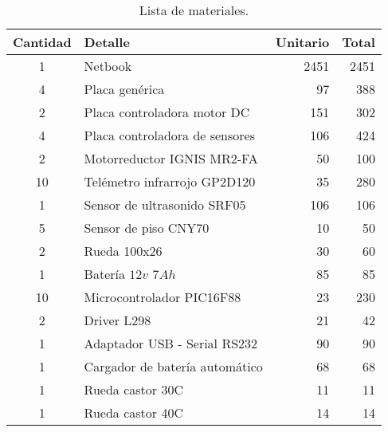\begin{table}[h]
	\begin{center}
		\begin{tabular}{|c|l|r|r|}
			\hline
			Cantidad & Detalle & Unitario  & Total \\
			\hline
			1 & Netbook & 2451 & 2451 \\
			\hline
			4 & Placa gen\'erica & 97 & 388 \\
			\hline
			2 & Placa controladora motor DC & 151 & 302 \\
			\hline
			4 & Placa controladora de sensores & 106 & 424 \\
			\hline
			2 & Motorreductor IGNIS MR2-FA & 50 & 100 \\
			\hline
			10 & Tel\'emetro infrarrojo GP2D120 & 35 & 280 \\
			\hline
			1 & Sensor de ultrasonido SRF05 & 106 & 106 \\
			\hline
			5 & Sensor de piso CNY70 & 10 & 50 \\
			\hline
			2 & Rueda 100x26 & 30 & 60 \\
			\hline
			1 & Bater\'ia $12v$ $7Ah$  & 85 & 85 \\
			\hline
			10 & Microcontrolador PIC16F88 & 23 & 230 \\
			\hline
			2 & Driver L298 & 21 & 42 \\
			\hline
			1 & Adaptador USB - Serial RS232 & 90 & 90 \\
			\hline
			1 & Cargador de bater\'ia autom\'atico & 68 & 68 \\
			\hline
			1 & Rueda castor 30C & 11 & 11 \\
			\hline
			1 & Rueda castor 40C & 14 & 14 \\
			\hline
		\end{tabular}
	\end{center}
	\caption{Lista de materiales.}
	\label{hT_motorDC}
\end{table}